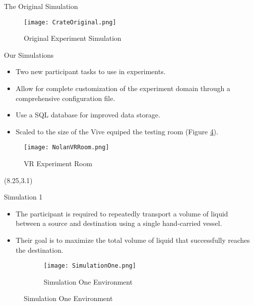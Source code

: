 \documentclass[22pt]{beamer}
\begin{document}
\begin{frame}[fragile]
\begin{textblock}{7.25}
\begin{block}{The Original Simulation}
\begin{figure}
    \texttt{[image: CrateOriginal.png]}
  \caption{Original Experiment Simulation}
\label{fig:orig}
\end{figure}
\end{block}

\begin{block}{Our Simulations}
\begin{itemize}
\item Two new participant tasks to use in experiments.
\item Allow for complete customization of the experiment domain through a  comprehensive configuration file.
\item Use a SQL database for improved data storage.
\item Scaled to the size of the Vive equiped the testing room (Figure \ref{fig:room}).
\end{itemize}
\begin{figure}
    \texttt{[image: NolanVRRoom.png]}
  \caption{VR Experiment Room}
\label{fig:room}
\end{figure}
\end{block}


\end{textblock}



\begin{textblock}{7.25}(8.25,3.1)

\begin{block}{Simulation 1}
\begin{itemize}
\item The participant is required to repeatedly transport a
volume of liquid between a source and destination using a single hand-carried
vessel.
\item Their goal is to maximize the total volume of liquid that successfully
reaches the destination.
\end{itemize}

\begin{figure}
\begin{figure}
    \texttt{[image: SimulationOne.png]}
  \caption{Simulation One Environment}
\label{fig:room}
\end{figure}
\end{figure}





\end{block}
\end{textblock}
\end{frame}
\end{document}
